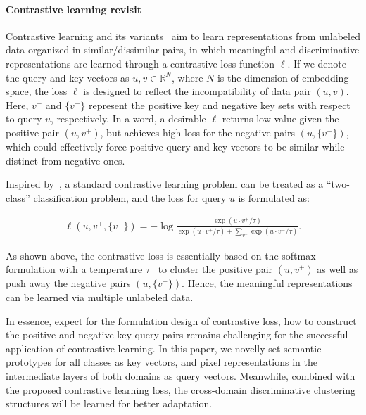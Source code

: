 \documentclass[runningheads]{llncs}
\newcommand{\Rb}{\mathbb{R}}
\begin{document}
\paragraph{Contrastive learning revisit} 
Contrastive learning and its variants~\cite{hadsell2006dimensionality,he2020momentum,oord2018infoNCE} aim to learn representations from unlabeled data organized in similar/dissimilar pairs, in which meaningful and discriminative representations are learned through a contrastive loss function $\ell$. If we denote the query and key vectors as $u, v\in \Rb^N$, where $N$ is the dimension of embedding space, the loss $\ell$ is designed to reflect the incompatibility of data pair $(u,v)$. Here, $v^+$ and $\{v^-\}$ represent the positive key and negative key sets with respect to query $u$, respectively. In a word, a desirable $\ell$ returns low value given the positive pair $(u,v^+)$, but achieves high loss for the negative pairs $(u,\{v^-\})$, which could effectively force positive query and key vectors to be similar while distinct from negative ones. 

Inspired by~\cite{oord2018infoNCE}, a standard contrastive learning problem can be treated as a ``two-class'' classification problem, and the loss for query $u$ is formulated as:
 \begin{small}
    \begin{align}
        \ell({u,v^+,\{v^-\}}) = -\log \frac{\exp\left(u{\cdot}v^+ / \tau\right)}{\exp\left(u{\cdot}v^+ / \tau\right) + {\displaystyle\sum_{v^-} \exp\left(u{\cdot}v^- / \tau\right)}}.
    \end{align}
\end{small}As shown above, the contrastive loss is essentially based on the softmax formulation with a temperature $\tau$~\cite{ge2020contrastive,park2020contrastive,oord2018infoNCE} to cluster the positive pair $(u,v^+)$ as well as push away the negative pairs $(u,\{v^-\})$. Hence, the meaningful representations can be learned via multiple unlabeled data. 

In essence, expect for the formulation design of contrastive loss, how to construct the positive and negative key-query pairs remains challenging for the successful application of contrastive learning. In this paper, we novelly set semantic prototypes for all classes as key vectors, and pixel representations in the intermediate layers of both domains as query vectors. Meanwhile, combined with the proposed contrastive learning loss, the cross-domain discriminative clustering structures will be learned for better adaptation.
\end{document}
